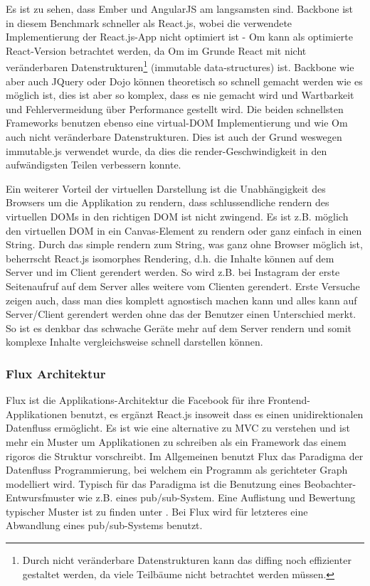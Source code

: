 \documentclass[12pt,twoside]{book}
\begin{document}
Es ist zu sehen, dass Ember und AngularJS am langsamsten sind. Backbone ist in diesem Benchmark schneller als React.js, wobei die verwendete Implementierung der React.js-App nicht optimiert ist - Om\cite{om} kann als optimierte React-Version betrachtet werden, da Om im Grunde React mit nicht veränderbaren Datenstrukturen\footnote{Durch nicht veränderbare Datenstrukturen kann das diffing noch effizienter gestaltet werden, da viele Teilbäume nicht betrachtet werden müssen.} (immutable data-structures) ist. Backbone wie aber auch JQuery oder Dojo können theoretisch so schnell gemacht werden wie es möglich ist, dies ist aber so komplex, dass es nie gemacht wird und Wartbarkeit und Fehlervermeidung über Performance gestellt wird.
Die beiden schnellsten Frameworks benutzen ebenso eine virtual-DOM Implementierung und wie Om auch nicht veränderbare Datenstrukturen.
Dies ist auch der Grund weswegen immutable.js\citep{Immutable} verwendet wurde, da dies die render-Geschwindigkeit in den aufwändigsten Teilen verbessern konnte.

Ein weiterer Vorteil der virtuellen Darstellung ist die Unabhängigkeit des Browsers um die Applikation zu rendern, dass schlussendliche rendern des virtuellen DOMs in den richtigen DOM ist nicht zwingend. Es ist z.B. möglich den virtuellen DOM in ein Canvas-Element zu rendern oder ganz einfach in einen String. Durch das simple rendern zum String, was ganz ohne Browser möglich ist, beherrscht React.js isomorphes Rendering, d.h. die Inhalte können auf dem Server und im Client gerendert werden. So wird z.B. bei Instagram der erste Seitenaufruf auf dem Server alles weitere vom Clienten gerendert. Erste Versuche zeigen auch, dass man dies komplett agnostisch machen kann und alles kann auf Server/Client gerendert werden ohne das der Benutzer einen Unterschied merkt. So ist es denkbar das schwache Geräte mehr auf dem Server rendern und somit komplexe Inhalte vergleichsweise schnell darstellen können.

\subsubsection{Flux Architektur}

Flux ist die Applikations-Architektur die Facebook für ihre Frontend-Applikationen benutzt, es ergänzt React.js insoweit dass es einen unidirektionalen Datenfluss ermöglicht. Es ist wie eine alternative zu MVC zu verstehen und ist mehr ein Muster um Applikationen zu schreiben als ein Framework das einem rigoros die Struktur vorschreibt. Im Allgemeinen benutzt Flux das Paradigma der Datenfluss Programmierung\cite{johnston2004advances}, bei welchem ein Programm als gerichteter Graph modelliert wird. Typisch für das Paradigma ist die Benutzung eines Beobachter-Entwursfmuster wie z.B. eines pub/sub-System. Eine Auflistung und Bewertung typischer Muster ist zu finden unter \citep{signals}. Bei Flux wird für letzteres eine Abwandlung eines pub/sub-Systems benutzt.
\end{document}
